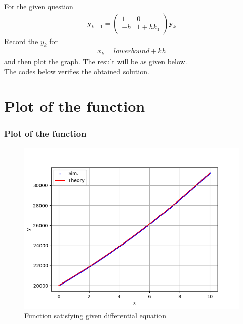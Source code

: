 \documentclass{beamer}
\theoremstyle{remark}
\newcommand{\myvec}[1]{\ensuremath{\begin{pmatrix}#1\end{pmatrix}}}
\let\vec\mathbf
\numberwithin{equation}{section}
\begin{document}
\begin{frame}
For the given question\\
\begin{align}
	\vec{y}_{k+1} = \myvec{1 & 0\\ -h & 1+hk_0}\vec{y}_k
\end{align}
Record the $y_k$ for 
\begin{align}
x_k =lowerbound+kh
\end{align}
and then plot the graph. The result will be as given below.\\
The codes below verifies the obtained solution. 
\end{frame}
\section{Plot of the function}
\begin{frame}
\frametitle{Plot of the function}
\begin{figure}[H]
    \centering
	\includegraphics[width=0.8\columnwidth]{figs/fig.png}
    \caption{Function satisfying given differential equation}
    \end{figure}   
\end{frame}
\end{document}
